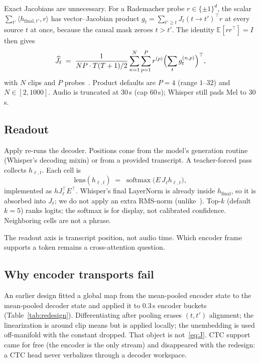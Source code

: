 \documentclass[conference]{IEEEtran}
\begin{document}
Exact Jacobians are unnecessary. For a Rademacher probe \(r\in\{\pm 1\}^d\), the scalar \(\sum_{t'}\langle h_{\mathrm{final},t'},r\rangle\) has vector--Jacobian product
\(g_t=\sum_{t'\ge t}J_\ell(t\!\to\! t')^\top r\)
at every source \(t\) at once, because the causal mask zeroes \(t>t'\). The identity \(\mathbb{E}[rr^\top]=I\) then gives
\begin{equation}
\widehat{J}_\ell
\;=\;
\frac{1}{NP\cdot T(T+1)/2}
\sum_{n=1}^{N}\sum_{p=1}^{P}
r^{(p)}\Bigl(\sum_t g_t^{(n,p)}\Bigr)^\top,
\label{eq:hutch}
\end{equation}
with \(N\) clips and \(P\) probes~\cite{hutchinson1989trace}. Product defaults are \(P=4\) (range \(1\)--\(32\)) and \(N\in[2,1000]\). Audio is truncated at 30\,s (cap 60\,s); Whisper still pads Mel to 30\,s.

\subsection{Readout}

Apply re-runs the decoder. Positions come from the model's generation routine (Whisper's decoding mixin) or from a provided transcript. A teacher-forced pass collects \(h_{\ell,t}\). Each cell is
\begin{equation}
\mathrm{lens}(h_{\ell,t})
\;=\;
\operatorname{softmax}\bigl(E\,J_\ell h_{\ell,t}\bigr),
\label{eq:lens}
\end{equation}
implemented as \(h J_\ell^\top E^\top\). Whisper's final LayerNorm is already inside \(h_{\mathrm{final}}\), so it is absorbed into \(J_\ell\); we do not apply an extra RMS-norm (unlike~\cite{gurnee2026workspace}). Top-\(k\) (default \(k=5\)) ranks logits; the softmax is for display, not calibrated confidence. Neighboring cells are not a phrase.

The readout axis is transcript position, not audio time. Which encoder frame supports a token remains a cross-attention question.

\subsection{Why encoder transports fail}

An earlier design fitted a global map from the mean-pooled encoder state to the mean-pooled decoder state and applied it to 0.3\,s encoder buckets (Table~\ref{tab:redesign}). Differentiating after pooling erases \((t,t')\) alignment; the linearization is around clip means but is applied locally; the unembedding is used off-manifold with the constant dropped. That object is not~\eqref{eq:J}. CTC support came for free (the encoder is the only stream) and disappeared with the redesign: a CTC head never verbalizes through a decoder workspace.
\end{document}
